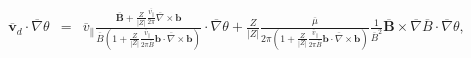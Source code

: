 \documentclass{article}
\begin{document}
\begin{eqnarray}
  \overline{\mathbf{v}}_d \cdot \overline{\nabla} \theta & = &
  \overline{v}_{\parallel} \frac{\overline{\mathbf{B}} + \frac{Z}{| Z |}
  \frac{\overline{v_{\parallel}}}{2 \pi} \overline{\nabla} \times
  \mathbf{b}}{\overline{B} \left( 1 + \frac{Z}{| Z |}
  \frac{\overline{v}_{\parallel}}{2 \pi \overline{B}} \mathbf{b} \cdot
  \overline{\nabla} \times \mathbf{b} \right)} \cdot \overline{\nabla} \theta
  + \frac{Z}{| Z |} \frac{\overline{\mu}}{2 \pi \left( 1 + \frac{Z}{| Z |}
  \frac{\overline{v}_{\parallel}}{2 \pi \overline{B}} \mathbf{b} \cdot
  \overline{\nabla} \times \mathbf{b} \right)} \frac{1}{\overline{B}^2}
  \overline{\mathbf{B}} \times \overline{\nabla} \overline{B} \cdot
  \overline{\nabla} \theta, 
\end{eqnarray}
\end{document}
